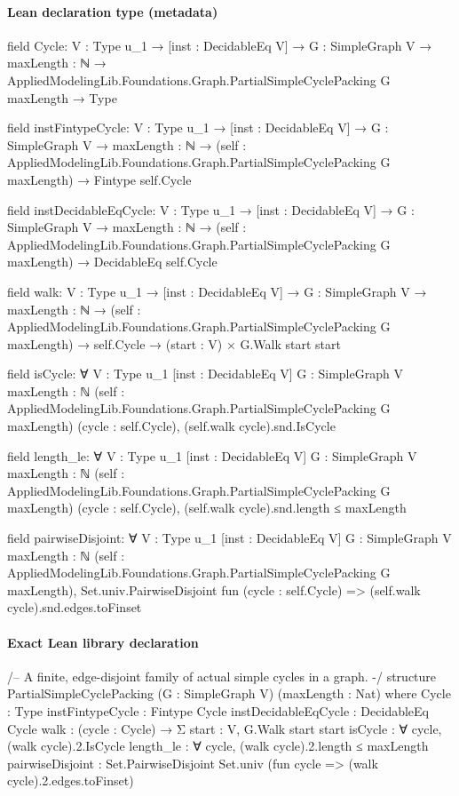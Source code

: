 \documentclass[10pt]{article}
\begin{document}
\paragraph{Lean declaration type (metadata)}
\begin{ReviewVerbatim}
field Cycle:
{V : Type u_1} →
  [inst : DecidableEq V] →
    {G : SimpleGraph V} →
      {maxLength : ℕ} → AppliedModelingLib.Foundations.Graph.PartialSimpleCyclePacking G maxLength → Type

field instFintypeCycle:
{V : Type u_1} →
  [inst : DecidableEq V] →
    {G : SimpleGraph V} →
      {maxLength : ℕ} →
        (self : AppliedModelingLib.Foundations.Graph.PartialSimpleCyclePacking G maxLength) → Fintype self.Cycle

field instDecidableEqCycle:
{V : Type u_1} →
  [inst : DecidableEq V] →
    {G : SimpleGraph V} →
      {maxLength : ℕ} →
        (self : AppliedModelingLib.Foundations.Graph.PartialSimpleCyclePacking G maxLength) → DecidableEq self.Cycle

field walk:
{V : Type u_1} →
  [inst : DecidableEq V] →
    {G : SimpleGraph V} →
      {maxLength : ℕ} →
        (self : AppliedModelingLib.Foundations.Graph.PartialSimpleCyclePacking G maxLength) →
          self.Cycle → (start : V) × G.Walk start start

field isCycle:
∀ {V : Type u_1} [inst : DecidableEq V] {G : SimpleGraph V} {maxLength : ℕ}
  (self : AppliedModelingLib.Foundations.Graph.PartialSimpleCyclePacking G maxLength) (cycle : self.Cycle),
  (self.walk cycle).snd.IsCycle

field length_le:
∀ {V : Type u_1} [inst : DecidableEq V] {G : SimpleGraph V} {maxLength : ℕ}
  (self : AppliedModelingLib.Foundations.Graph.PartialSimpleCyclePacking G maxLength) (cycle : self.Cycle),
  (self.walk cycle).snd.length ≤ maxLength

field pairwiseDisjoint:
∀ {V : Type u_1} [inst : DecidableEq V] {G : SimpleGraph V} {maxLength : ℕ}
  (self : AppliedModelingLib.Foundations.Graph.PartialSimpleCyclePacking G maxLength),
  Set.univ.PairwiseDisjoint fun (cycle : self.Cycle) => (self.walk cycle).snd.edges.toFinset
\end{ReviewVerbatim}

\paragraph{Exact Lean library declaration}
\begin{ReviewVerbatim}
/-- A finite, edge-disjoint family of actual simple cycles in a graph. -/
structure PartialSimpleCyclePacking (G : SimpleGraph V) (maxLength : Nat) where
  Cycle : Type
  instFintypeCycle : Fintype Cycle
  instDecidableEqCycle : DecidableEq Cycle
  walk : (cycle : Cycle) → Σ start : V, G.Walk start start
  isCycle : ∀ cycle, (walk cycle).2.IsCycle
  length_le : ∀ cycle, (walk cycle).2.length ≤ maxLength
  pairwiseDisjoint : Set.PairwiseDisjoint Set.univ
    (fun cycle => (walk cycle).2.edges.toFinset)
\end{ReviewVerbatim}
\end{document}
